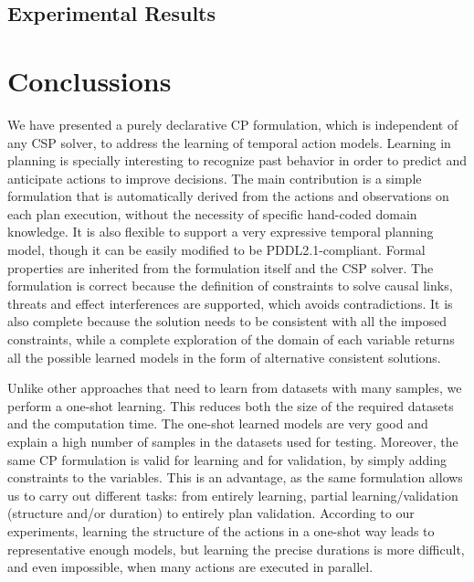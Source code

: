 \documentclass{ecai}
\begin{document}
\subsection{Experimental Results}




\section{Conclussions}
\label{sec:conclusions}


We have presented a purely declarative CP formulation, which is independent of any CSP solver, to address the learning of temporal action models. Learning in planning is specially interesting to recognize past behavior in order to predict and anticipate actions to improve decisions.
The main contribution is a simple formulation that is automatically derived from the actions and observations on each plan execution, without the necessity of specific hand-coded domain knowledge. It is also flexible to support a very expressive temporal planning model, though it can be easily modified to be PDDL2.1-compliant.
Formal properties are inherited from the formulation itself and the CSP solver. The formulation is correct because the definition of constraints to solve causal links, threats and effect interferences are supported, which avoids contradictions. It is also complete because the solution needs to be consistent with all the imposed constraints, while a complete exploration of the domain of each variable returns all the possible learned models in the form of alternative consistent solutions.


Unlike other approaches that need to learn from datasets with many samples, we perform a one-shot learning. This reduces both the size of the required datasets and the computation time. The one-shot learned models are very good and explain a high number of samples in the datasets used for testing. Moreover, the same CP formulation is valid for learning and for validation, by simply adding constraints to the variables. This is an advantage, as the same formulation allows us to carry out different tasks: from entirely learning, partial learning/validation (structure and/or duration) to entirely plan validation.
According to our experiments, learning the structure of the actions in a one-shot way leads to representative enough models, but learning the precise durations is more difficult, and even impossible, when many actions are executed in parallel.
\end{document}
